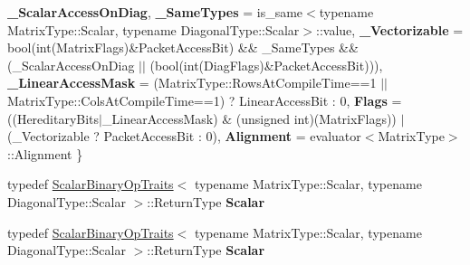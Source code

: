 \begin{DoxyCompactItemize}
\newline
{\bfseries \+\_\+\+Scalar\+Access\+On\+Diag}, 
{\bfseries \+\_\+\+Same\+Types} = is\+\_\+same$<$typename Matrix\+Type\+:\+:Scalar, typename Diagonal\+Type\+:\+:Scalar$>$\+:\+:value, 
{\bfseries \+\_\+\+Vectorizable} = bool(int(Matrix\+Flags)\&Packet\+Access\+Bit) \&\& \+\_\+\+Same\+Types \&\& (\+\_\+\+Scalar\+Access\+On\+Diag $\vert$$\vert$ (bool(int(Diag\+Flags)\&Packet\+Access\+Bit))), 
{\bfseries \+\_\+\+Linear\+Access\+Mask} = (Matrix\+Type\+:\+:Rows\+At\+Compile\+Time==1 $\vert$$\vert$ Matrix\+Type\+:\+:Cols\+At\+Compile\+Time==1) ? Linear\+Access\+Bit \+: 0, 
\newline
{\bfseries Flags} = ((Hereditary\+Bits$\vert$\+\_\+\+Linear\+Access\+Mask) \& (unsigned int)(Matrix\+Flags)) $\vert$ (\+\_\+\+Vectorizable ? Packet\+Access\+Bit \+: 0), 
{\bfseries Alignment} = evaluator$<$Matrix\+Type$>$\+:\+:Alignment
 \}
\item 
\mbox{\label{struct_eigen_1_1internal_1_1diagonal__product__evaluator__base_ad110e69ee2799e8dfeee209795641dfd}} 
typedef \hyperlink{group___core___module_struct_eigen_1_1_scalar_binary_op_traits}{Scalar\+Binary\+Op\+Traits}$<$ typename Matrix\+Type\+::\+Scalar, typename Diagonal\+Type\+::\+Scalar $>$\+::Return\+Type {\bfseries Scalar}
\item 
\mbox{\label{struct_eigen_1_1internal_1_1diagonal__product__evaluator__base_ad110e69ee2799e8dfeee209795641dfd}} 
typedef \hyperlink{group___core___module_struct_eigen_1_1_scalar_binary_op_traits}{Scalar\+Binary\+Op\+Traits}$<$ typename Matrix\+Type\+::\+Scalar, typename Diagonal\+Type\+::\+Scalar $>$\+::Return\+Type {\bfseries Scalar}
\end{DoxyCompactItemize}
